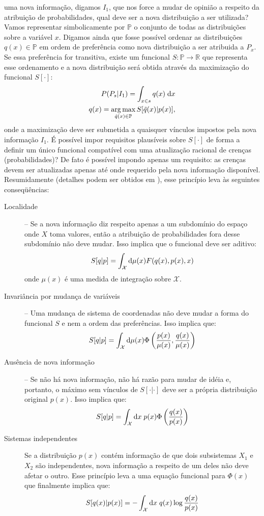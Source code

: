  uma nova informação, digamos $I_1$, que nos force a mudar de opinião a respeito da atribuição de probabilidades, qual deve ser a nova distribuição a ser utilizada? Vamos representar simbolicamente por $\mathbb{P}$ o conjunto de todas as distribuições sobre a variável $x$. Digamos ainda que fosse possível ordenar as distribuições $q(x) \in \mathbb{P}$ em ordem de preferência como nova distribuição a ser atribuida a $P_x$. Se essa preferência for transitiva, existe um funcional $S:\mathbb{P}\to\mathbb{R}$ que representa esse ordenamento e a nova distribuição será obtida através da maximização do funcional $S[\cdot]$:
\begin{align}
 P(P_{s} | I_{1}) = \int_{x\in s} q(x)\;\mathrm{d} x \nonumber \\
 q(x) = \operatorname*{arg\,max}_{\tilde{q}(x) \in \mathbb{P}} S[\tilde{q}(x) | p(x)], \nonumber
\end{align}
onde a maximização deve ser submetida a quaisquer vínculos impostos pela nova informação $I_1$. É possível impor requisitos plausíveis sobre $S[\cdot]$ de forma a definir um único funcional compatível com uma atualização racional de crenças (probabilidades)? De fato é possível impondo apenas um requisito: as crenças devem ser atualizadas apenas até onde requerido pela nova informação disponível. Resumidamente (detalhes podem ser obtidos em \citet{ACaticha2008}), esse princípio leva às seguintes conseqüências:
\begin{description}
\item[Localidade] -- Se a nova informação diz respeito apenas a um subdomínio do espaço onde $X$ toma valores, então a atribuição de probabilidades fora desse subdomínio não deve mudar. Isso implica que o funcional deve ser aditivo:
    \[
     S[q | p] = \int_{\mathcal{X}} \mathrm{d}\mu(x) F(q(x), p(x), x)
    \]
    onde $\mu(x)$ é uma medida de integração sobre $\mathcal{X}$. 
\item[Invariância por mudança de variáveis] -- Uma mudança de sistema de coordenadas não deve mudar a forma do funcional $S$ e nem a ordem das preferências. Isso implica que:
    \[
     S[q | p] = \int_{\mathcal{X}} \mathrm{d}\mu(x) \Phi\left(\frac{p(x)}{\mu(x)},\frac{q(x)}{\mu(x)}\right)
    \]
\item[Ausência de nova informação] -- Se não há nova informação, não há razão para mudar de idéia e, portanto, o máximo sem vínculos de $S[\cdot|\cdot]$ deve ser a própria distribuição original $p(x)$. Isso implica que:
    \[
     S[q | p] = \int_{\mathcal{X}} \mathrm{d} x\; p(x) \Phi\left(\frac{q(x)}{p(x)}\right) 
    \]
\item[Sistemas independentes] 
    Se a distribuição $p(x)$ contém informação de que dois subsistemas $X_1$ e $X_2$ são independentes, nova informação a respeito de um deles não deve afetar o outro. Esse princípio leva a uma equação funcional para $\Phi(x)$ que finalmente implica que:
    \begin{equation}
      \label{eq:relel}
      S[q(x) | p(x)] =  - \int_{\mathcal{X}} \ud x\; q(x) \log\frac{q(x)}{p(x)}
    \end{equation}
\end{description}

